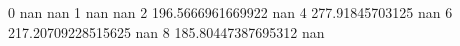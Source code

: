 0 nan nan
1 nan nan
2 196.5666961669922 nan
4 277.91845703125 nan
6 217.20709228515625 nan
8 185.80447387695312 nan
